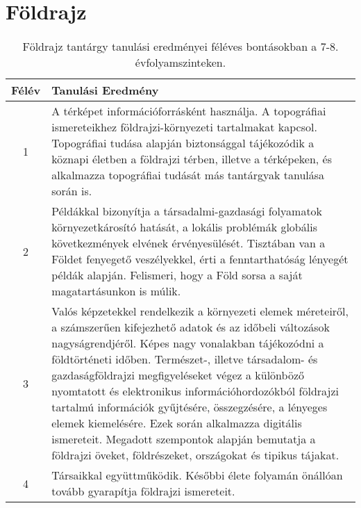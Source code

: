         \section{Földrajz}

       
           \begin{longtable}{c | p{} }
            \caption[Földrajz 7-8.]{Földrajz tantárgy tanulási eredményei féléves bontásokban a 7-8. évfolyamszinteken. }  \\

            \textbf{Félév} & \textbf{Tanulási Eredmény} \\
            \hline
            \endhead
                                          
                                          1 &  A térképet információforrásként használja. A topográfiai ismereteikhez földrajzi-környezeti tartalmakat kapcsol. Topográfiai tudása alapján biztonsággal tájékozódik a köznapi életben a földrajzi térben, illetve a térképeken, és alkalmazza topográfiai tudását más tantárgyak tanulása során is. \\ \hline
                                      
                                
                                          2 &  Példákkal bizonyítja a társadalmi-gazdasági folyamatok környezetkárosító hatását, a lokális problémák globális következmények elvének érvényesülését. Tisztában van a Földet fenyegető veszélyekkel, érti a fenntarthatóság lényegét példák alapján. Felismeri, hogy a Föld sorsa a saját magatartásunkon is múlik. \\ \hline
                                      
                                
                                          3 &  Valós képzetekkel rendelkezik a környezeti elemek méreteiről, a számszerűen kifejezhető adatok és az időbeli változások nagyságrendjéről. Képes nagy vonalakban tájékozódni a földtörténeti időben. Természet-, illetve társadalom- és gazdaságföldrajzi megfigyeléseket végez a különböző nyomtatott és elektronikus információhordozókból földrajzi tartalmú információk gyűjtésére, összegzésére, a lényeges elemek kiemelésére. Ezek során alkalmazza digitális ismereteit. Megadott szempontok alapján bemutatja a földrajzi öveket, földrészeket, országokat és tipikus tájakat. \\ \hline
                                          4 &  Társaikkal együttműködik. Későbbi élete folyamán önállóan tovább gyarapítja földrajzi ismereteit. \\ \hline
                                      
                        \end{longtable}
            \clearpage

